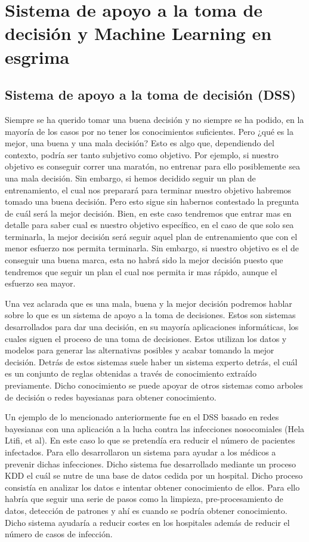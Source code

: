 \newline

\section{Sistema de apoyo a la toma de decisión y Machine Learning en esgrima}
\subsection{Sistema de apoyo a la toma de decisión (DSS)}

Siempre se ha querido tomar una buena decisión y no siempre se ha podido, en la mayoría de los casos
 por no tener los conocimientos suficientes. Pero ¿qué es la mejor, una buena y una mala decisión?
 Esto es algo que, dependiendo del contexto, podría ser tanto subjetivo como objetivo. Por ejemplo, si nuestro
 objetivo es conseguir correr una maratón, no entrenar para ello posiblemente sea una mala decisión.
 Sin embargo, si hemos decidido seguir un plan de entrenamiento, el cual nos preparará para terminar
 nuestro objetivo habremos tomado una buena decisión. Pero esto sigue sin habernos contestado la pregunta
 de cuál será la mejor decisión. Bien, en este caso tendremos que entrar mas en detalle para saber
 cual es nuestro objetivo específico, en el caso de que solo sea terminarla, la mejor decisión será seguir aquel
 plan de entrenamiento que con el menor esfuerzo nos permita terminarla. Sin embargo, si nuestro objetivo
 es el de conseguir una buena marca, esta no habrá sido la mejor decisión puesto que tendremos que
 seguir un plan el cual nos permita ir mas rápido, aunque el esfuerzo sea mayor.

Una vez aclarada que es una mala, buena y la mejor decisión podremos hablar sobre lo que es un sistema
 de apoyo a la toma de decisiones. Estos son sistemas desarrollados para dar una decisión, en su mayoría
 aplicaciones informáticas, los cuales siguen el proceso de una toma de decisiones. Estos utilizan
 los datos y modelos para generar las alternativas posibles y acabar tomando la mejor decisión. Detrás
 de estos sistemas suele haber un sistema experto detrás, el cuál es un conjunto de reglas obtenidas
 a través de conocimiento extraído previamente. Dicho conocimiento se puede apoyar de otros sistemas como
 arboles de decisión o redes bayesianas para obtener conocimiento.

Un ejemplo de lo mencionado anteriormente fue en el DSS basado en redes bayesianas con una aplicación
 a la lucha contra las infecciones nosocomiales (Hela Ltifi, et al). En este caso lo que se pretendía
 era reducir el número de pacientes infectados. Para ello desarrollaron un sistema para ayudar a los
 médicos a prevenir dichas infecciones. Dicho sistema fue desarrollado mediante un proceso KDD el
 cuál se nutre de una base de datos cedida por un hospital. Dicho proceso consistía en analizar los datos
 e intentar obtener conocimiento de ellos. Para ello habría que seguir una serie de pasos como la
 limpieza, pre-procesamiento de datos, detección de patrones y ahí es cuando se podría obtener conocimiento.
 Dicho sistema ayudaría a reducir costes en los hospitales además de reducir el número de casos de infección.

